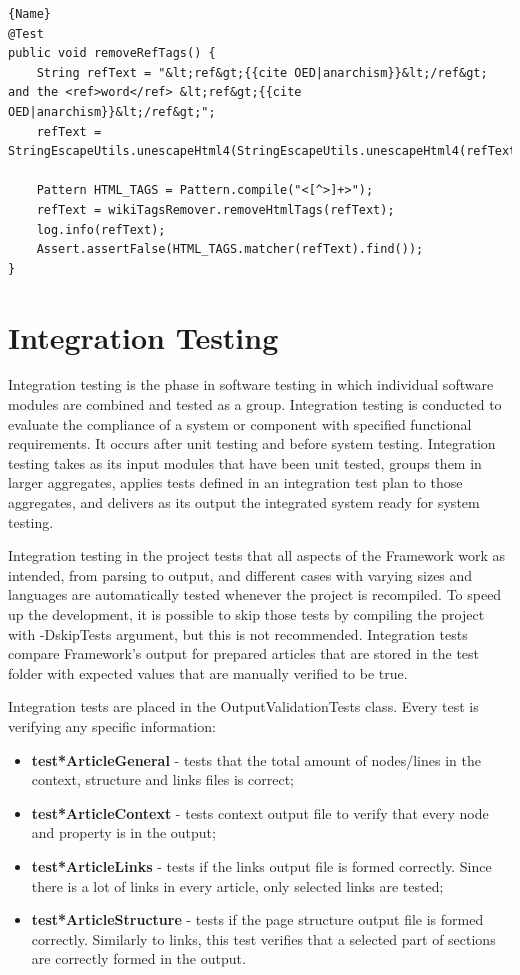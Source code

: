 \documentclass[thesis=M,english,hidelinks]{FITthesis}[2019/12/23]
\begin{document}
\begin{lstlisting}[caption=Regression Testing,frame=tlrb,  label = {lst:regression-test-example}]{Name}
@Test
public void removeRefTags() {
	String refText = "&lt;ref&gt;{{cite OED|anarchism}}&lt;/ref&gt; and the <ref>word</ref> &lt;ref&gt;{{cite OED|anarchism}}&lt;/ref&gt;";
	refText = StringEscapeUtils.unescapeHtml4(StringEscapeUtils.unescapeHtml4(refText));

	Pattern HTML_TAGS = Pattern.compile("<[^>]+>");
	refText = wikiTagsRemover.removeHtmlTags(refText);
	log.info(refText);
	Assert.assertFalse(HTML_TAGS.matcher(refText).find());
}
\end{lstlisting}

\section{Integration Testing}

Integration testing is the phase in software testing in which individual software modules are combined and tested as a group. Integration testing is conducted to evaluate the compliance of a system or component with specified functional requirements\cite{integration_test1}. It occurs after unit testing and before system testing. Integration testing takes as its input modules that have been unit tested, groups them in larger aggregates, applies tests defined in an integration test plan to those aggregates, and delivers as its output the integrated system ready for system testing\cite{integration_test2}.


Integration testing in the project tests that all aspects of the Framework work as intended, from parsing to output, and different cases with varying sizes and languages are automatically tested whenever the project is recompiled. To speed up the development, it is possible to skip those tests by compiling the project with -DskipTests argument, but this is not recommended. Integration tests compare Framework's output for prepared articles that are stored in the test folder with expected values that are manually verified to be true. 

Integration tests are placed in the OutputValidationTests class. Every test is verifying any specific information:

\begin{itemize}
	\item \textbf{test*ArticleGeneral} - tests that the total amount of nodes/lines in the context, structure and links files is correct;
	\item \textbf{test*ArticleContext} - tests context output file to verify that every node and property is in the output;
	\item \textbf{test*ArticleLinks} - tests if the links output file is formed correctly. Since there is a lot of links in every article, only selected links are tested;
	\item \textbf{test*ArticleStructure} - tests if the page structure output file is formed correctly. Similarly to links, this test verifies that a selected part of sections are correctly formed in the output.
\end{itemize}
\end{document}

